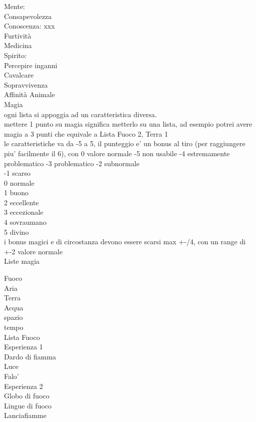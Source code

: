 \documentclass[12pt,a4paper]{book}
\begin{document}
Mente:\\
Consapevolezza\\
Conoscenza: xxx\\
Furtività\\
Medicina\\

Spirito:\\
Percepire inganni\\
Cavalcare\\
Sopravvivenza\\
Affinità Animale\\

Magia\\
ogni lista si appoggia ad un caratteristica diversa.\\
mettere 1 punto su magia significa metterlo su una lista, ad esempio potrei avere magia a 3 punti che equivale a Lista Fuoco 2, Terra 1\\

le caratteristiche va da -5 a 5, il punteggio e' un bonus al tiro (per raggiungere piu' facilmente il 6), con 0 valore normale
-5 non usabile
-4 estremamente problematico
-3 problematico
-2 subnormale\\
-1 scarso\\
0 normale\\
1 buono\\
2 eccellente\\
3 eccezionale\\
4 sovraumano\\
5 divino\\

i bonus magici e di circostanza devono essere scarsi max +-/4, con un range di +-2 valore normale\\

Liste magia

Fuoco\\
Aria\\
Terra \\
Acqua\\
spazio\\
tempo\\

Lista Fuoco\\

Esperienza 1\\
Dardo di fiamma\\
Luce\\
Falo'\\

Esperienza 2\\
Globo di fuoco\\
Lingue di fuoco\\
Lanciafiamme\\
\end{document}

